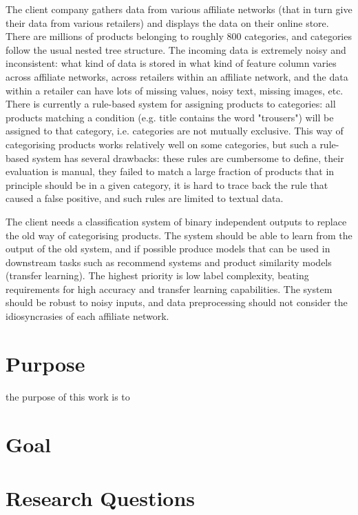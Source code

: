 The client company gathers data from various affiliate networks (that in turn give their data from various retailers) and displays the data on their online store.
There are millions of products belonging to roughly 800 categories, and categories follow the usual nested tree structure.
The incoming data is extremely noisy and inconsistent: what kind of data is stored in what kind of feature column varies across affiliate networks, across retailers within an affiliate network, and the data within a retailer can have lots of missing values, noisy text, missing images, etc.
There is currently a rule-based system for assigning products to categories: all products matching a condition (e.g. title contains the word "trousers") will be assigned to that category, i.e. categories are not mutually exclusive.
This way of categorising products works relatively well on some categories, but such a rule-based system has several drawbacks: these rules are cumbersome to define, their evaluation is manual, they failed to match a large fraction of products that in principle should be in a given category, it is hard to trace back the rule that caused a false positive, and such rules are limited to textual data.

The client needs a classification system of binary independent outputs to replace the old way of categorising products.
The system should be able to learn from the output of the old system, and if possible produce models that can be used in downstream tasks such as recommend systems and product similarity models (transfer learning).
The highest priority is low label complexity, beating requirements for high accuracy and transfer learning capabilities.
The system should be robust to  noisy inputs, and data preprocessing should not consider the idiosyncrasies of each affiliate network.

\section{Purpose}

 the purpose of this work is to

\section{Goal}

\section{Research Questions}

